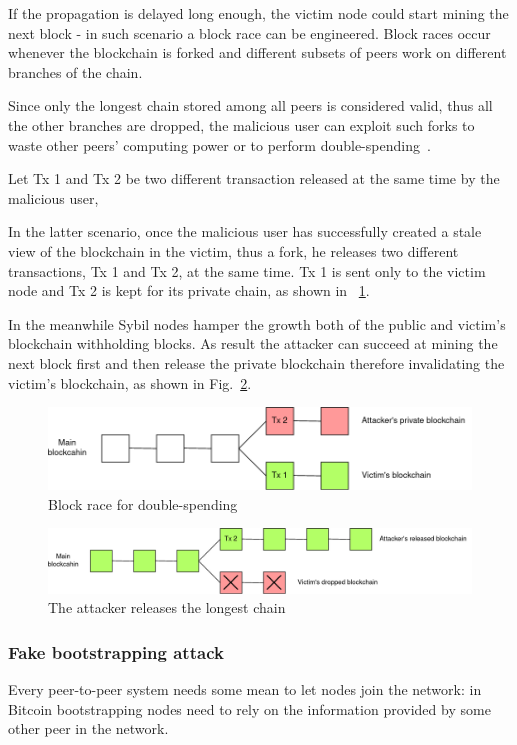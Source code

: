\documentclass[12pt, letterpaper, twoside]{article}
\begin{document}
If the propagation is delayed long enough, the victim node could start mining the next block - in such scenario a block race can be engineered. Block races occur whenever the blockchain is forked and different subsets of peers work on different branches of the chain.

Since only the longest chain stored among all peers is considered valid, thus all the other branches are dropped, the malicious user can exploit such forks to waste other peers' computing power or to perform double-spending~\cite{zhang-ds-sybil}.

Let Tx 1 and Tx 2 be two different transaction released at the same time by the malicious user,  

In the latter scenario, once the malicious user has successfully created a stale view of the blockchain in the victim, thus a fork, he releases two different transactions, Tx 1 and Tx 2, at the same time. Tx 1 is sent only to the victim node and Tx 2 is kept for its private chain, as shown in ~\ref{fig:race1}.

In the meanwhile Sybil nodes hamper the growth both of the public and victim's blockchain withholding blocks. As result the attacker can succeed at mining the next block first and then release the private blockchain therefore invalidating the victim's blockchain, as shown in Fig.~\ref{fig:race2}.

\begin{figure}[h!]
	\includegraphics[width=.9\textwidth]{pict/blockrace1.png}
	\centering
	\caption{Block race for double-spending}
	\label{fig:race1}
\end{figure}

\begin{figure}[h!]
	\includegraphics[width=.9\textwidth]{pict/blockrace2.png}
	\centering
	\caption{The attacker releases the longest chain}
	\label{fig:race2}
\end{figure}



\subsubsection{Fake bootstrapping attack}\label{sec:fakeboot}
Every peer-to-peer system needs some mean to let nodes join the network: in Bitcoin bootstrapping nodes need to rely on the information provided by some other peer in the network.
\end{document}
